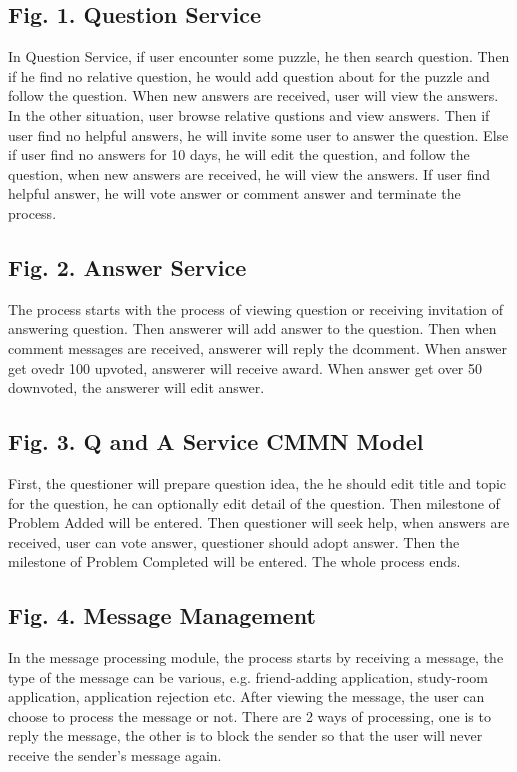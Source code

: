 \documentclass[runningheads]{llncs}
\begin{document}
\subsection{Fig. 1. Question Service}
In Question Service, if user encounter some puzzle, he then search question. Then if he find no relative question, he would add question about for the puzzle and follow the question. When new answers are received, user will view the answers. In the other situation, user browse relative qustions and view answers. Then if user find no helpful answers, he will invite some user to answer the question. Else if user find no answers for 10 days, he will edit the question, and follow the question, when new answers are received, he will view the answers. If user find helpful answer, he will vote answer or comment answer and terminate the process.
\subsection{Fig. 2. Answer Service}
The process starts with the process of viewing question or receiving invitation of answering question. Then answerer will add answer to the question. Then when comment messages are received, answerer will reply the dcomment. When answer get ovedr 100 upvoted, answerer will receive award. When answer get over 50 downvoted, the answerer will edit answer.
\subsection{Fig. 3. Q and A Service CMMN Model}
First, the questioner will prepare question idea, the he should edit title and topic for the question, he can optionally edit detail of the question. Then milestone of Problem Added will be entered. Then questioner will seek help, when answers are received, user can vote answer, questioner should adopt answer. Then the milestone of Problem Completed will be entered. The whole process ends.
\subsection{Fig. 4. Message Management}
In the message processing module, the process starts by receiving a message, the type of the message can be various, e.g. friend-adding application, study-room application, application rejection etc. After viewing the message, the user can choose to process the message or not. There are 2 ways of processing, one is to reply the message, the other is to block the sender so that the user will never receive the sender’s message again.
\end{document}
